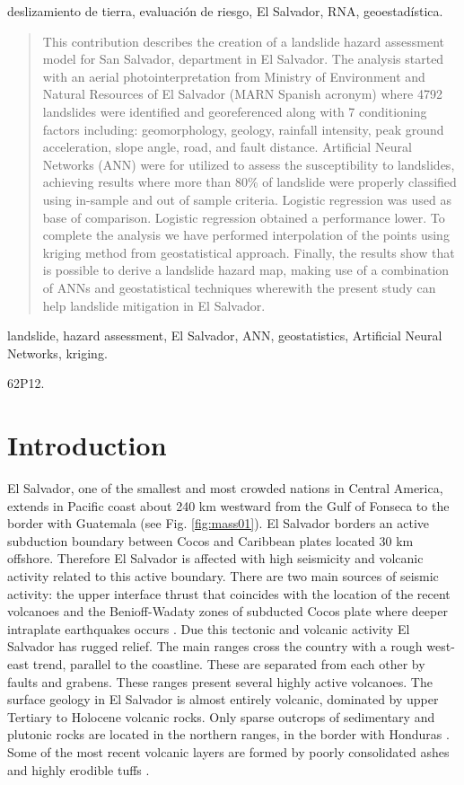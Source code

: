 \documentclass[11pt,twoside]{rmta2010esp}%
\begin{document}
\PC deslizamiento de tierra, evaluaci\'{o}n de riesgo, El Salvador, RNA, geoestad\'{i}stica.

\begin{abstract}
This contribution describes the creation of a landslide hazard
assessment model for San Salvador, department in El Salvador. The analysis started with an aerial photointerpretation from Ministry of Environment and Natural Resources of El Salvador (MARN Spanish acronym) where 4792 landslides were identified and georeferenced 
along with 7 conditioning factors including: geomorphology, geology, rainfall intensity, peak ground acceleration, slope angle, road, and fault distance. Artificial Neural Networks (ANN) were for utilized to assess the susceptibility to
landslides, achieving results where more than 80\% of landslide were properly classified using
in-sample and out of sample criteria. Logistic regression was used as base of
comparison. Logistic regression obtained a performance lower. To complete the analysis we have
performed interpolation of the points using kriging method from geostatistical
approach. Finally, the results show that is possible to derive a landslide hazard map, making use of a combination of ANNs and geostatistical techniques
wherewith the present study can help landslide mitigation in El Salvador.
\end{abstract}

\KW landslide, hazard assessment, El Salvador, ANN, geostatistics, Artificial Neural Networks, kriging.

\AMS 62P12.%



\section{Introduction}
\label{sec:intr}
El Salvador, one of the smallest and most crowded nations in Central America, extends in Pacific coast about 240 km westward from the Gulf of Fonseca to the border with Guatemala (see Fig. \ref{fig:mass01}). El Salvador borders an active subduction boundary between Cocos and Caribbean plates located 30 km offshore. Therefore El Salvador is affected with high seismicity and volcanic activity related to this active boundary. There are two main sources of seismic activity: the upper interface thrust that coincides with the location of the recent volcanoes and the Benioff-Wadaty zones of subducted Cocos plate where deeper intraplate earthquakes occurs \cite{dewey}. Due this tectonic and volcanic activity El Salvador has rugged relief. The main ranges cross the country with a rough west-east trend, parallel to the coastline. These are separated from each other by faults and grabens. These ranges present several highly active volcanoes. The surface geology in El Salvador is almost entirely volcanic, dominated by upper Tertiary to Holocene volcanic rocks. Only sparse outcrops of sedimentary and plutonic rocks are located in the northern ranges, in the border with Honduras \cite{weber}. Some of the most recent volcanic layers are formed by poorly consolidated ashes and highly erodible tuffs \cite{bommer}.
\end{document}

